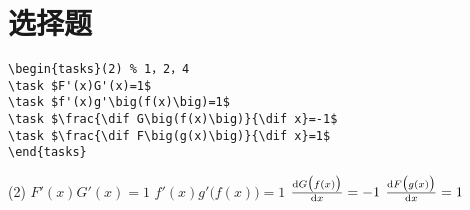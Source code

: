 \documentclass[11pt,twoside]{article} %
\begin{document}
\section{选择题}
\begin{lstlisting}[style=tsdtex]
\begin{tasks}(2) % 1，2，4
\task $F'(x)G'(x)=1$
\task $f'(x)g'\big(f(x)\big)=1$
\task $\frac{\dif G\big(f(x)\big)}{\dif x}=-1$
\task $\frac{\dif F\big(g(x)\big)}{\dif x}=1$	
\end{tasks}
\end{lstlisting}
\begin{tasks}(2) %
\task $F'(x)G'(x)=1$
\task $f'(x)g'\big(f(x)\big)=1$
\task $\frac{\mathop{}\!\mathrm{d} G\big(f(x)\big)}{\mathop{}\!\mathrm{d} x}=-1$
\task $\frac{\mathop{}\!\mathrm{d} F\big(g(x)\big)}{\mathop{}\!\mathrm{d} x}=1$	
\end{tasks}



\clearpage
\end{document}
